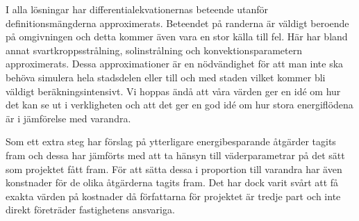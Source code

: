 I alla lösningar har differentialekvationernas beteende utanför definitionsmängderna approximerats. Beteendet på randerna
är väldigt beroende på omgivningen och detta kommer även vara en stor källa till fel. Här har bland annat svartkroppsstrålning,
solinstrålning och konvektionsparametern approximerats. Dessa approximationer är en nödvändighet för att man inte ska behöva
simulera hela stadsdelen eller till och med staden vilket kommer bli väldigt beräkningsintensivt. Vi hoppas ändå att våra
värden ger en idé om hur det kan se ut i verkligheten och att det ger en god idé om hur stora energiflödena är i jämförelse med varandra.

Som ett extra steg har förslag på ytterligare energibesparande åtgärder tagits fram och dessa har jämförts med att ta hänsyn till väderparametrar på det sätt som projektet fått fram. För att sätta dessa i proportion till varandra har även konstnader för de olika åtgärderna tagits fram. Det har dock varit svårt att få exakta värden på kostnader då författarna för projektet är tredje part och inte direkt företräder fastighetens ansvariga.
